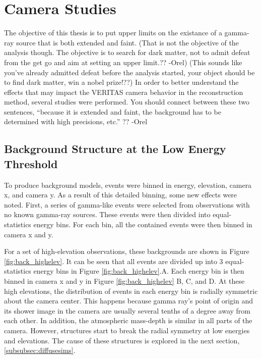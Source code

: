   \FloatBarrier

\section{Camera Studies}
  The objective of this thesis is to put upper limits on the existance of a gamma-ray source that is both extended and faint.
  {\color{red}(That is not the objective of the analysis though. The objective is to search for dark matter, not to admit defeat from the get go and aim at setting an upper limit.?? -Orel) (This sounds like you've already admitted defeat before the analysis started, your object should be to find dark matter, win a nobel prize!??)}
  In order to better understand the effects that may impact the VERITAS camera behavior in the reconstruction method, several studies were performed.
  {\color{red} You should connect between these two sentences, “because it is extended and faint, the background has to be determined with high precisions, etc.” ?? -Orel}

  \subsection{Background Structure at the Low Energy Threshold}
    To produce background models, events were binned in energy, elevation, camera x, and camera y.
    As a result of this detailed binning, some new effects were noted.
    First, a series of gamma-like events were selected from observations with no known gamma-ray sources.
    These events were then divided into equal-statistics energy bins.
    For each bin, all the contained events were then binned in camera x and y.

    For a set of high-elevation observations, these backgrounds are shown in Figure \ref{fig:back_highelev}.
    It can be seen that all events are divided up into 3 equal-statistics energy bins in Figure \ref{fig:back_highelev}.A.
    Each energy bin is then binned in camera x and y in Figure \ref{fig:back_highelev} B, C, and D.
    At these high elevations, the distribution of events in each energy bin is radially symmetric about the camera center.
    This happens because gamma ray's point of origin and its shower image in the camera are usually several tenths of a degree away from each other.
    In addition, the atmospheric mass-depth is similar in all parts of the camera.
    However, structures start to break the radial symmetry at low energies and elevations.
    The cause of these structures is explored in the next section, \ref{subsubsec:diffusesims}.

